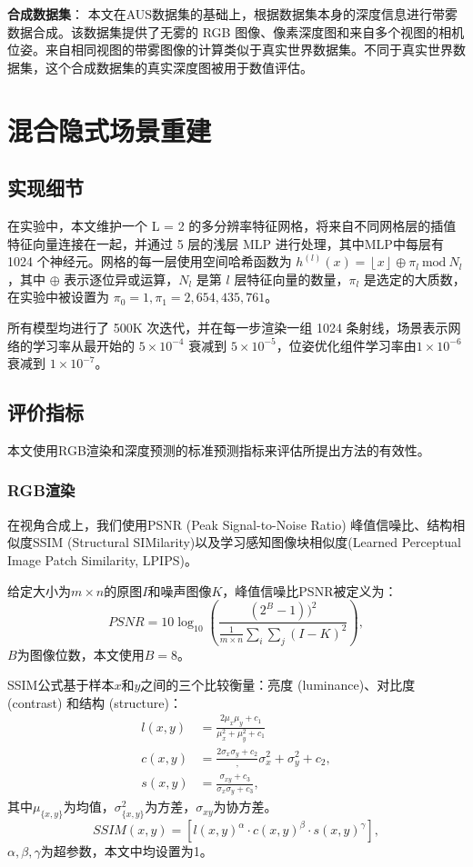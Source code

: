\textbf{合成数据集}：
本文在AUS数据集的基础上，根据数据集本身的深度信息进行带雾数据合成。该数据集提供了无雾的 RGB 图像、像素深度图和来自多个视图的相机位姿。来自相同视图的带雾图像的计算类似于真实世界数据集。不同于真实世界数据集，这个合成数据集的真实深度图被用于数值评估。

\section{混合隐式场景重建}
\subsection{实现细节}
在实验中，本文维护一个 L = 2 的多分辨率特征网格，将来自不同网格层的插值特征向量连接在一起，并通过 5 层的浅层 MLP 进行处理，其中MLP中每层有 1024 个神经元。网格的每一层使用空间哈希函数为 $h^{(l)}(x) = \left\lfloor x\right\rfloor \oplus \pi_l\ \text{mod}\ N_l$，其中 $\oplus$ 表示逐位异或运算，$N_l$ 是第 $l$ 层特征向量的数量，$π_l$ 是选定的大质数，在实验中被设置为 $\pi_0 = 1, \pi_1 = 2,654,435, 761$。

所有模型均进行了 500K 次迭代，并在每一步渲染一组 1024 条射线，场景表示网络的学习率从最开始的 $5\times10^{-4}$ 衰减到 $5\times10^{-5}$，位姿优化组件学习率由$1\times10^{-6}$ 衰减到 $1\times10^{-7}$。

\subsection{评价指标}
本文使用RGB渲染和深度预测的标准预测指标来评估所提出方法的有效性。
\subsubsection{RGB渲染}
在视角合成上，我们使用PSNR (Peak Signal-to-Noise Ratio) 峰值信噪比、结构相似度SSIM (Structural SIMilarity)以及学习感知图像块相似度(Learned Perceptual Image Patch Similarity, LPIPS)。

给定大小为$m\times n$的原图$I$和噪声图像$K$，峰值信噪比PSNR被定义为：
\begin{equation}
    PSNR =  10\log_{10}(\frac{(2^B-1))^2}{\frac{1}{m\times n}\sum_i\sum_j(I-K)^2}),
\end{equation}
$B$为图像位数，本文使用$B=8$。

SSIM公式基于样本$x$和$y$之间的三个比较衡量：亮度 (luminance)、对比度 (contrast) 和结构 (structure)：
\begin{align}
    l(x,y) &= \frac{2\mu_x\mu_y+c_1}{\mu_x^2+\mu_y^2+c_1}\\
    c(x,y) &= \frac{2\sigma_x\sigma_y+c_2},{\sigma_x^2+\sigma_y^2+c_2},\\
    s(x,y) &= \frac{\sigma_{xy}+c_3}{\sigma_x\sigma_y+c_3},
\end{align}
其中$\mu_{\{x,y\}}$为均值，$\sigma_{\{x,y\}}^2$为方差，$\sigma_{xy}$为协方差。
\begin{equation}
    SSIM(x,y) = [l(x,y)^\alpha\cdot c(x,y)^\beta\cdot s(x,y)^\gamma],
\end{equation}
$\alpha, \beta, \gamma$为超参数，本文中均设置为1。

